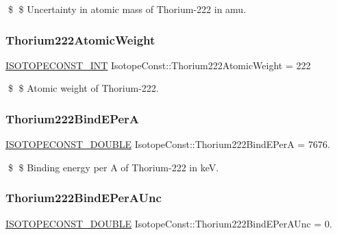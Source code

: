 \$ \$ Uncertainty in atomic mass of Thorium-\/222 in amu. \mbox{\label{group___isotope_const-_thorium-_th222_ga14046931cce96cff2f79173b25702cad}} 
\subsubsection{\texorpdfstring{Thorium222\+Atomic\+Weight}{Thorium222AtomicWeight}}
{\footnotesize\ttfamily \mbox{\hyperlink{group___isotope_const-_macros_ga5f18360b3e99483a35c32d789e62621c}{I\+S\+O\+T\+O\+P\+E\+C\+O\+N\+S\+T\+\_\+\+I\+NT}} Isotope\+Const\+::\+Thorium222\+Atomic\+Weight = 222}

\$ \$ Atomic weight of Thorium-\/222. \mbox{\label{group___isotope_const-_thorium-_th222_gaabe5ee372203299866e88fc49b273673}} 
\subsubsection{\texorpdfstring{Thorium222\+Bind\+E\+PerA}{Thorium222BindEPerA}}
{\footnotesize\ttfamily \mbox{\hyperlink{group___isotope_const-_macros_ga8f45a7272ce02c0b4c65c44636ed719a}{I\+S\+O\+T\+O\+P\+E\+C\+O\+N\+S\+T\+\_\+\+D\+O\+U\+B\+LE}} Isotope\+Const\+::\+Thorium222\+Bind\+E\+PerA = 7676.}

\$ \$ Binding energy per A of Thorium-\/222 in keV. \mbox{\label{group___isotope_const-_thorium-_th222_ga9c40acb56961de10cef6914a62951ef7}} 
\subsubsection{\texorpdfstring{Thorium222\+Bind\+E\+Per\+A\+Unc}{Thorium222BindEPerAUnc}}
{\footnotesize\ttfamily \mbox{\hyperlink{group___isotope_const-_macros_ga8f45a7272ce02c0b4c65c44636ed719a}{I\+S\+O\+T\+O\+P\+E\+C\+O\+N\+S\+T\+\_\+\+D\+O\+U\+B\+LE}} Isotope\+Const\+::\+Thorium222\+Bind\+E\+Per\+A\+Unc = 0.}

